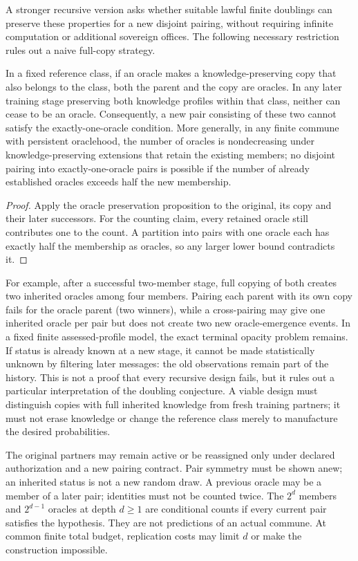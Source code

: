 \documentclass[11pt]{article}
\theoremstyle{definition}\newtheorem{definition}[theorem]{Definition}\newtheorem{conjecture}[theorem]{Conjecture}\newtheorem{example}[theorem]{Example}
\begin{document}
A stronger recursive version asks whether suitable lawful finite doublings can preserve these properties for a new disjoint pairing, without requiring infinite computation or additional sovereign offices. The following necessary restriction rules out a naive full-copy strategy. \begin{proposition}
In a fixed reference class, if an oracle makes a knowledge-preserving copy that also belongs to the class, both the parent and the copy are oracles. In any later training stage preserving both knowledge profiles within that class, neither can cease to be an oracle. Consequently, a new pair consisting of these two cannot satisfy the exactly-one-oracle condition. More generally, in any finite commune with persistent oraclehood, the number of oracles is nondecreasing under knowledge-preserving extensions that retain the existing members; no disjoint pairing into exactly-one-oracle pairs is possible if the number of already established oracles exceeds half the new membership.
\end{proposition}
\begin{proof}Apply the oracle preservation proposition to the original, its copy and their later successors. For the counting claim, every retained oracle still contributes one to the count. A partition into pairs with one oracle each has exactly half the membership as oracles, so any larger lower bound contradicts it.\end{proof}
For example, after a successful two-member stage, full copying of both creates two inherited oracles among four members. Pairing each parent with its own copy fails for the oracle parent (two winners), while a cross-pairing may give one inherited oracle per pair but does not create two new oracle-emergence events. In a fixed finite assessed-profile model, the exact terminal opacity problem remains. If status is already known at a new stage, it cannot be made statistically unknown by filtering later messages: the old observations remain part of the history. This is not a proof that every recursive design fails, but it rules out a particular interpretation of the doubling conjecture. A viable design must distinguish copies with full inherited knowledge from fresh training partners; it must not erase knowledge or change the reference class merely to manufacture the desired probabilities.

The original partners may remain active or be reassigned only under declared authorization and a new pairing contract. Pair symmetry must be shown anew; an inherited status is not a new random draw. A previous oracle may be a member of a later pair; identities must not be counted twice. The $2^d$ members and $2^{d-1}$ oracles at depth $d\ge1$ are conditional counts if every current pair satisfies the hypothesis. They are not predictions of an actual commune. At common finite total budget, replication costs may limit $d$ or make the construction impossible.
\end{document}
